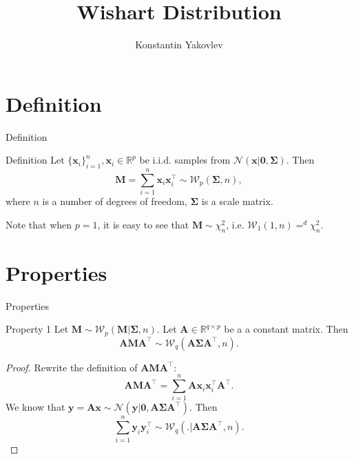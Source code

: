 \documentclass{beamer}
\title{Wishart Distribution}
\author{Konstantin Yakovlev}
\institute{MIPT, 2022}
\begin{document}
\begin{frame}
    \titlepage
\end{frame}


\begin{frame}
    \tableofcontents
\end{frame}


\section{Definition}

\begin{frame}{Definition}
    \begin{block}{Definition}
    Let $\{\mathbf{x}_i\}_{i=1}^n, \mathbf{x}_i \in \mathbb{R}^p$ be $\mathrm{i.i.d.}$ samples from
    $\mathcal{N}(\mathbf{x}|\boldsymbol{0}, \mathbf{\Sigma})$. Then
    \[
        \mathbf{M} = \sum_{i=1}^n \mathbf{x}_i\mathbf{x}_i^\top \sim \mathcal{W}_p(\mathbf{\Sigma}, n),
    \]
    where $n$ is a number of degrees of freedom, $\mathbf{\Sigma}$ is a scale matrix.
    \end{block}

    Note that when $p = 1$, it is easy to see that $\mathbf{M} \sim \chi^2_{n}$, i.e.
    $\mathcal{W}_1(1, n) =^d \chi^2_n$.

\end{frame}


\section{Properties}

\begin{frame}{Properties}
    \begin{block}{Property 1}
        Let $\mathbf{M} \sim \mathcal{W}_p(\mathbf{M}|\mathbf{\Sigma}, n)$.
        Let $\mathbf{A}\in \mathbb{R}^{q\times p}$ be a a constant matrix.
        Then
        \[
            \mathbf{A}\mathbf{M}\mathbf{A}^\top \sim \mathcal{W}_q(\mathbf{A}\mathbf{\Sigma}\mathbf{A}^\top, n).
        \]
    \end{block}
    \begin{proof}
        Rewrite the definition of $\mathbf{A}\mathbf{M}\mathbf{A}^\top$:
        \[
            \mathbf{A}\mathbf{M}\mathbf{A}^\top = \sum_{i=1}^n\mathbf{A}\mathbf{x}_i\mathbf{x}_i^\top\mathbf{A}^\top.
        \]
        We know that $\mathbf{y} = \mathbf{A}\mathbf{x} \sim \mathcal{N}(\mathbf{y}|\mathbf{0}, \mathbf{A}\mathbf{\Sigma}\mathbf{A}^\top)$. Then
        \[
            \sum_{i=1}^n\mathbf{y}_i\mathbf{y}_i^\top \sim \mathcal{W}_q(.|\mathbf{A}\mathbf{\Sigma}\mathbf{A}^\top, n).
        \]
    \end{proof}

\end{frame}
\end{document}
